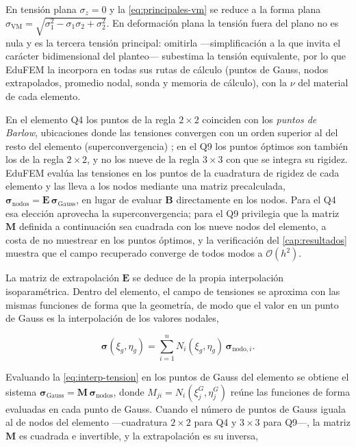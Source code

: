 En tensión plana $\sigma_z = 0$ y la \autoref{eq:principales-vm} se reduce a la forma plana $\sigma_{\mathrm{VM}} = \sqrt{\sigma_1^2 - \sigma_1\sigma_2 + \sigma_2^2}$. En deformación plana la tensión fuera del plano no es nula y es la tercera tensión principal: omitirla —simplificación a la que invita el carácter bidimensional del planteo— subestima la tensión equivalente, por lo que EduFEM la incorpora en todas sus rutas de cálculo (puntos de Gauss, nodos extrapolados, promedio nodal, sonda y memoria de cálculo), con la $\nu$ del material de cada elemento.

En el elemento Q4 los puntos de la regla $2\times2$ coinciden con los \emph{puntos de Barlow}, ubicaciones donde las tensiones convergen con un orden superior al del resto del elemento (superconvergencia) \autocite[p.~231]{cook2002concepts}; en el Q9 los puntos óptimos son también los de la regla $2\times2$, y no los nueve de la regla $3\times3$ con que se integra su rigidez. EduFEM evalúa las tensiones en los puntos de la cuadratura de rigidez de cada elemento y las lleva a los nodos mediante una matriz precalculada, $\bm{\sigma}_{\text{nodos}} = \bm{E}\,\bm{\sigma}_{\text{Gauss}}$, en lugar de evaluar $\bm{B}$ directamente en los nodos. Para el Q4 esa elección aprovecha la superconvergencia; para el Q9 privilegia que la matriz $\bm{M}$ definida a continuación sea cuadrada con los nueve nodos del elemento, a costa de no muestrear en los puntos óptimos, y la verificación del \autoref{cap:resultados} muestra que el campo recuperado converge de todos modos a $\mathcal{O}(h^{2})$.

La matriz de extrapolación $\bm{E}$ se deduce de la propia interpolación isoparamétrica. Dentro del elemento, el campo de tensiones se aproxima con las mismas funciones de forma que la geometría, de modo que el valor en un punto de Gauss es la interpolación de los valores nodales,

\begin{equation}
\bm{\sigma}(\xi_g,\eta_g) = \sum_{i=1}^{n} N_i(\xi_g,\eta_g)\,\bm{\sigma}_{\text{nodo},i}.
\label{eq:interp-tension}
\end{equation}

Evaluando la \autoref{eq:interp-tension} en los puntos de Gauss del elemento se obtiene el sistema $\bm{\sigma}_{\text{Gauss}} = \bm{M}\,\bm{\sigma}_{\text{nodos}}$, donde $M_{ji} = N_i(\xi_j^{G},\eta_j^{G})$ reúne las funciones de forma evaluadas en cada punto de Gauss. Cuando el número de puntos de Gauss iguala al de nodos del elemento —cuadratura $2\times2$ para Q4 y $3\times3$ para Q9—, la matriz $\bm{M}$ es cuadrada e invertible, y la extrapolación es su inversa,

